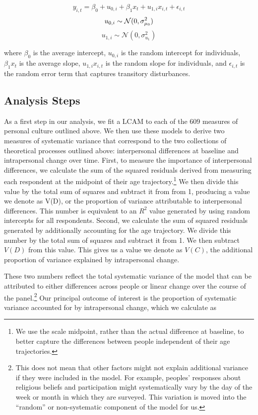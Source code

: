 \documentclass[
  12pt,
]{article}
\begin{document}
\[
y_{i, t} = \beta_0 + u_{0, i} + \beta_{1} x_t + u_{1, i} x_{i, t} + \epsilon_{i, t}
\] \[
u_{0,i} \sim \mathcal{N}(0,\sigma_{\mu_0}^2) \\
\] \[
u_{1,i} \sim \mathcal{N}(0,\sigma_{u_1}^2)
\]

where \(\beta_0\) is the average intercept, \(u_{0, i}\) is the random
intercept for individuals, \(\beta_1 x_t\) is the average slope,
\(u_{1, i} x_{i, t}\) is the random slope for individuals, and
\(\epsilon_{i, t}\) is the random error term that captures transitory
disturbances.

\hypertarget{analysis-steps}{%
\subsection{Analysis Steps}\label{analysis-steps}}

As a first step in our analysis, we fit a LCAM to each of the 609
measures of personal culture outlined above. We then use these models to
derive two measures of systematic variance that correspond to the two
collections of theoretical processes outlined above: interpersonal
differences at baseline and intrapersonal change over time. First, to
measure the importance of interpersonal differences, we calculate the
sum of the squared residuals derived from measuring each respondent at
the midpoint of their age trajectory.\footnote{We use the scale
  midpoint, rather than the actual difference at baseline, to better
  capture the differences between people independent of their age
  trajectories.} We then divide this value by the total sum of squares
and subtract it from from 1, producing a value we denote as V(D), or the
proportion of variance attributable to interpersonal differences. This
number is equivalent to an \(R^2\) value generated by using random
intercepts for all respondents. Second, we calculate the sum of squared
residuals generated by additionally accounting for the age trajectory.
We divide this number by the total sum of squares and subtract it from
1. We then subtract \(V(D)\) from this value. This gives us a value we
denote as \(V(C)\), the additional proportion of variance explained by
intrapersonal change.

These two numbers reflect the total systematic variance of the model
that can be attributed to either differences across people or linear
change over the course of the panel.\footnote{This does not mean that
  other factors might not explain additional variance if they were
  included in the model. For example, peoples' responses about religious
  beliefs and participation might systematically vary by the day of the
  week or month in which they are surveyed. This variation is moved into
  the ``random'' or non-systematic component of the model for us.} Our
principal outcome of interest is the proportion of systematic variance
accounted for by intrapersonal change, which we calculate as
\end{document}
